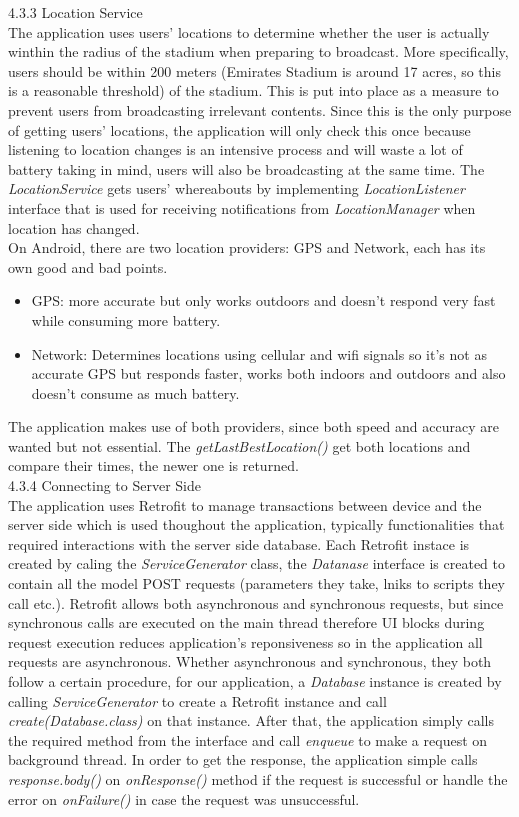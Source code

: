 \documentclass{article}
\begin{document}
\begin{flushleft}
\begin{itemize}
\end{itemize}
{\large 4.3.3 Location Service}\\
The application uses users' locations to determine whether the user is actually winthin the radius of the stadium when preparing to broadcast. More specifically, users should be within 200 meters (Emirates Stadium is around 17 acres, so this is a reasonable threshold) of the stadium. This is put into place as a measure to prevent users from broadcasting irrelevant contents. Since this is the only purpose of getting users' locations, the application will only check this once because listening to location changes is an intensive process and will waste a lot of battery taking in mind, users will also be broadcasting at the same time. The \textit{LocationService} gets users' whereabouts by implementing \textit{LocationListener} interface that is used for receiving notifications from \textit{LocationManager} when location has changed.\\
On Android, there are two location providers: GPS and Network, each has its own good and bad points.\\
\begin{itemize}
	\item GPS: more accurate but only works outdoors and doesn't respond very fast while consuming more battery.
	\item Network: Determines locations using cellular and wifi signals so it's not as accurate GPS but responds faster, works both indoors and outdoors and also doesn't consume as much battery.
\end{itemize}
The application makes use of both providers, since both speed and accuracy are wanted but not essential. The \textit{getLastBestLocation()} get both locations and compare their times, the newer one is returned.\\
{\large 4.3.4 Connecting to Server Side}\\
The application uses Retrofit to manage transactions between device and the server side which is used thoughout the application, typically functionalities that required interactions with the server side database. Each Retrofit instace is created by caling the \textit{ServiceGenerator} class, the \textit{Datanase} interface is created to contain all the model POST requests (parameters they take, lniks to scripts they call etc.). Retrofit allows both asynchronous and synchronous requests, but since synchronous calls are executed on the main thread therefore UI blocks during request execution reduces application's reponsiveness so in the application all requests are asynchronous. Whether asynchronous and synchronous, they both follow a certain procedure, for our application, a \textit{Database} instance is created by calling \textit{ServiceGenerator} to create a Retrofit instance and call \textit{create(Database.class)} on that instance. After that, the application simply calls the required method from the interface and call \textit{enqueue} to make a request on background thread. In order to get the response, the application simple calls \textit{response.body()} on \textit{onResponse()} method if the request is successful or handle the error on \textit{onFailure()} in case the request was unsuccessful.\\

\end{flushleft}
\end{document}
